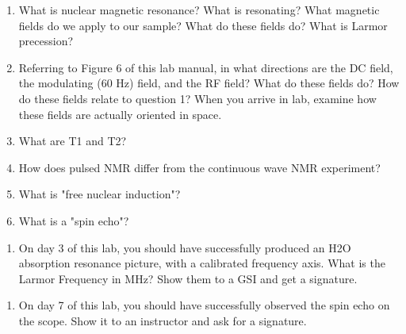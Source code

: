 \documentclass{../signatures}
\begin{document}
\maketitle

\names

\prelab

\begin{enumerate}

    \item What is nuclear magnetic resonance? What is resonating? What magnetic fields do we apply to our sample? What do these fields do? What is Larmor precession?
    
    \item Referring to Figure 6 of this lab manual, in what directions are the DC field, the modulating (60 Hz) field, and the RF field? What do these fields do? How do these fields relate to question 1? When you arrive in lab, examine how these fields are actually oriented in space. 

    \item What are T1 and T2?

    \item How does pulsed NMR differ from the continuous wave NMR experiment?

    \item What is "free nuclear induction"?

    \item What is a "spin echo"?
       \\[36pt]
\end{enumerate}

\prelabsignatures

\pagebreak

\midlab

\begin{enumerate}

    \item On day 3 of this lab, you should have successfully produced an H2O absorption resonance picture, with a calibrated frequency axis. What is the Larmor Frequency in MHz? Show them to a GSI and get a signature.
\\[36pt]
\end{enumerate}


\begin{enumerate}

\item On day 7 of this lab, you should have successfully observed the spin echo on the scope. Show it to an instructor and ask for a signature.
\\[36pt]
\end{enumerate}
\end{document}
